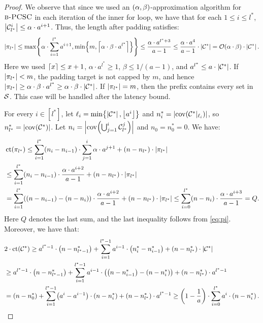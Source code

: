     \begin{proof}
        We observe that since we used an $\br{\alpha, \beta}$-approximation algorithm for $\ProblemBPCSC$ in each iteration of the inner for loop, we have that for each $1\leq i\leq l^*$, $\spr{\cC_{l^*}^i} \leq \alpha \cdot a^{i+1}$. Thus, the length after padding satisfies:
        \begin{equation} \label{eq:pi}
        \spr{\pi_{l^*}} \leq \max\brc{\alpha\cdot \sum_{i=1}^{l^*} a^{i+1},\min\brc{m,\cl{\alpha\cdot\beta\cdot a^{l^*}}}}\leq \frac{\alpha\cdot a^{l^*+3}}{a-1}\leq \frac{\alpha\cdot a^{4}}{a-1}\cdot\spr{\cCopt}=\bigo\br{\alpha\cdot\beta}\cdot\spr{\cCopt}.
        \end{equation}
        Here we used $\cl{x}\leq x+1$, $\alpha\cdot a^{l^*}\geq1$, $\beta\leq1/(a-1)$, and $a^{l^*}\leq a\cdot\spr{\cCopt}$. If $\spr{\pi_{l^*}}<m$, the padding target is not capped by $m$, and hence $\spr{\pi_{l^*}}\geq\alpha\cdot\beta\cdot a^{l^*}\geq\alpha\cdot\beta\cdot\spr{\cCopt}$. If $\spr{\pi_{l^*}}=m$, then the prefix contains every set in $\cS$. This case will be handled after the latency bound.

        For every $i\in [l^*]$, let $\ell_i=\min\brc{\spr{\cCopt},\fl{a^i}}$ and $n_i^*=\spr{\cov\br{\pref{\cCopt}{\ell_i}}}$, so $n_{l^*}^* = \spr{\cov\br{\cCopt}}$. Let $n_i=\spr{\cov\br{\bigcup_{j=1}^{i}\cC_{l^*}^j}}$ and $n_0=n_0^*=0$. We have:
        \begin{align*}
            &\coverageTime\br{\pi_{l^*}}\leq \sum_{i=1}^{l^*}\br{n_i-n_{i-1}}\cdot \sum_{j=1}^{i}\alpha\cdot a^{j+1} + \br{n-n_{l^*}}\cdot \spr{\pi_{l^*}}
            \\&\leq
            \sum_{i=1}^{l^*}\br{n_i-n_{i-1}}\cdot \frac{\alpha\cdot a^{i+2}}{a-1} + \br{n-n_{l^*}}\cdot \spr{\pi_{l^*}}
            \\&=
            \sum_{i=1}^{l^*}\br{\br{n-n_{i-1}}-\br{n-n_i}}\cdot \frac{\alpha\cdot a^{i+2}}{a-1} + \br{n-n_{l^*}}\cdot \spr{\pi_{l^*}} \leq
            \sum_{i=0}^{l^*}\br{n-n_i}\cdot \frac{\alpha\cdot a^{i+3}}{a-1} = Q.
        \end{align*}
        Here $Q$ denotes the last sum, and the last inequality follows from \eqref{eq:pi}.
        Moreover, we have that:
        \begin{align*}
            &2\cdot\coverageTime\br{\cCopt}\geq a^{l^*-1}\cdot\br{n-n_{l^*-1}^*}+ \sum_{i=1}^{l^*-1}a^{i-1}\cdot\br{n_i^*-n_{i-1}^*}+\br{n-n_{l^*}^*}\cdot\spr{\cCopt}
            \\&\geq
        a^{l^*-1}\cdot\br{n-n_{l^*-1}^*}+ \sum_{i=1}^{l^*-1}a^{i-1}\cdot\br{\br{n-n_{i-1}^*}-\br{n-n_{i}^*}}+\br{n-n_{l^*}^*}\cdot a^{l^*-1}
            \\&=
        \br{n-n_0^*}+\sum_{i=1}^{l^*-1}\br{a^{i}-a^{i-1}}\cdot\br{n-n_{i}^*}+\br{n-n_{l^*}^*}\cdot a^{l^*-1} \geq
        \br{1-\frac{1}{a}}\cdot\sum_{i=0}^{l^*}a^{i}\cdot \br{n-n_i^*}.
        \end{align*}


\end{proof}

